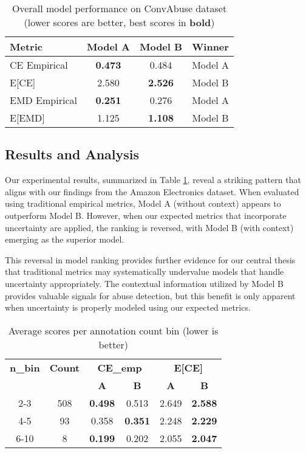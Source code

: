 \documentclass[journal]{IEEEtran}
\begin{document}
\begin{table}[t]
\centering
\caption{Overall model performance on ConvAbuse dataset (lower scores are better, best scores in \textbf{bold})}
\label{tab:convabuse_results}
\begin{tabular}{|l|cc|c|}
\hline
\textbf{Metric} & \textbf{Model A} & \textbf{Model B} & \textbf{Winner} \\
\hline
CE Empirical & \textbf{0.473} & 0.484 & Model A \\
E[CE] & 2.580 & \textbf{2.526} & Model B \\
EMD Empirical & \textbf{0.251} & 0.276 & Model A \\
E[EMD] & 1.125 & \textbf{1.108} & Model B \\
\hline
\end{tabular}
\end{table}

\subsection{Results and Analysis}

Our experimental results, summarized in Table \ref{tab:convabuse_results}, reveal a striking pattern that aligns with our findings from the Amazon Electronics dataset. When evaluated using traditional empirical metrics, Model A (without context) appears to outperform Model B. However, when our expected metrics that incorporate uncertainty are applied, the ranking is reversed, with Model B (with context) emerging as the superior model.

This reversal in model ranking provides further evidence for our central thesis that traditional metrics may systematically undervalue models that handle uncertainty appropriately. The contextual information utilized by Model B provides valuable signals for abuse detection, but this benefit is only apparent when uncertainty is properly modeled using our expected metrics.

\begin{table}[t]
\centering
\caption{Average scores per annotation count bin (lower is better)}
\label{tab:convabuse_bins}
\small
\begin{tabular}{|c|c|cc|cc|}
\hline
\textbf{n\_bin} & \textbf{Count} & \multicolumn{2}{c|}{\textbf{CE\_emp}} & \multicolumn{2}{c|}{\textbf{E[CE]}} \\
 & & \textbf{A} & \textbf{B} & \textbf{A} & \textbf{B} \\
\hline
2-3 & 508 & \textbf{0.498} & 0.513 & 2.649 & \textbf{2.588} \\
4-5 & 93 & 0.358 & \textbf{0.351} & 2.248 & \textbf{2.229} \\
6-10 & 8 & \textbf{0.199} & 0.202 & 2.055 & \textbf{2.047} \\
\hline
\end{tabular}
\end{table}
\end{document}
